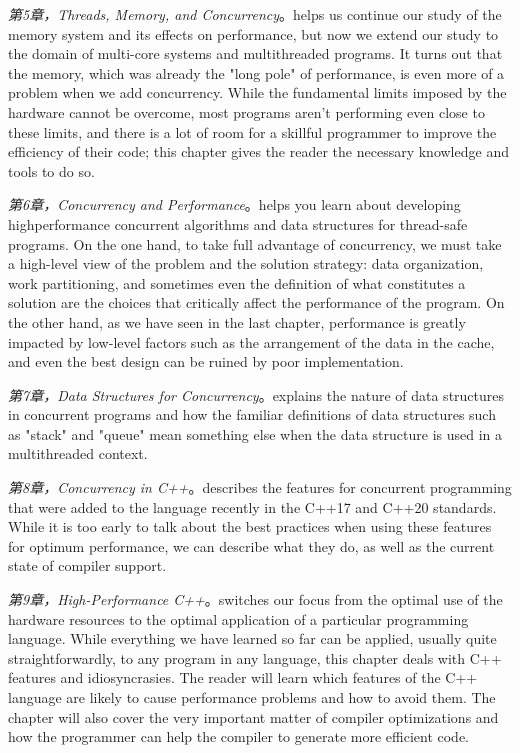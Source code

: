 \textit{第5章，Threads, Memory, and Concurrency}。helps us continue our study of the memory system and its effects on performance, but now we extend our study to the domain of multi-core systems and multithreaded programs. It turns out that the memory, which was already the "long pole" of performance, is even more of a problem when we add concurrency. While the fundamental limits imposed by the hardware cannot be overcome, most programs aren't performing even close to these limits, and there is a lot of room for a skillful programmer to improve the efficiency of their code; this chapter gives the reader the necessary knowledge and tools to do so.

\textit{第6章，Concurrency and Performance}。helps you learn about developing highperformance concurrent algorithms and data structures for thread-safe programs. On the one hand, to take full advantage of concurrency, we must take a high-level view of the problem and the solution strategy: data organization, work partitioning, and sometimes even the definition of what constitutes a solution are the choices that critically affect the performance of the program. On the other hand, as we have seen in the last chapter, performance is greatly impacted by low-level factors such as the arrangement of the data in the cache, and even the best design can be ruined by poor implementation.

\textit{第7章，Data Structures for Concurrency}。explains the nature of data structures in concurrent programs and how the familiar definitions of data structures such as "stack" and "queue" mean something else when the data structure is used in a multithreaded context.

\textit{第8章，Concurrency in C++}。describes the features for concurrent programming that were added to the language recently in the C++17 and C++20 standards. While it is too early to talk about the best practices when using these features for optimum performance, we can describe what they do, as well as the current state of compiler support.

\textit{第9章，High-Performance C++}。switches our focus from the optimal use of the hardware resources to the optimal application of a particular programming language. While everything we have learned so far can be applied, usually quite straightforwardly, to any program in any language, this chapter deals with C++ features and idiosyncrasies. The reader will learn which features of the C++ language are likely to cause performance problems and how to avoid them. The chapter will also cover the very important matter of compiler optimizations and how the programmer can help the compiler to generate more efficient code.

